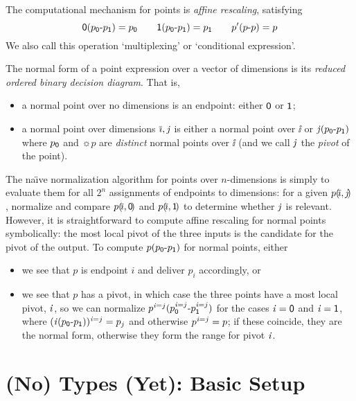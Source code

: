 \documentclass{article}
\begin{document}
The computational mechanism for points is \emph{affine rescaling}, satisfying
\[
\muxi\pze p = \sze p \qquad
\muxi\pun p = \sun p \qquad
\mux{p'}pp = p
\]
We also call this operation `multiplexing' or `conditional expression'.

The normal form of a point expression over a vector of dimensions
is its \emph{reduced ordered binary decision diagram}. That is,
\begin{itemize}
\item a normal point over no dimensions is an endpoint:
  either $\pze$ or $\pun$;
\item a normal point over dimensions $\ii, \vj$ is either a normal point
  over $\ii$ or $\muxi\vj p$ where $\sze p$ and $\sun p$ are \emph{distinct}
  normal points over $\ii$ (and we call $\vj$ the \emph{pivot} of the point).
\end{itemize}
The na\"\i{}ve normalization algorithm for points over $n$-dimensions is
simply to evaluate them for all $2^n$ assignments of endpoints to dimensions:
for a given $p\sv {\ii,\vj}$, normalize and compare $p\sv{\ii,\pze}$ and $p\sv{\ii,\pun}$ to determine whether $\vj$ is relevant. However, it is straightforward to compute
affine rescaling for normal points symbolically: the most local pivot
of the three inputs is the candidate for the pivot of the output.
To compute $\muxi pp$ for normal points, either
\begin{itemize}
\item we see that $p$ is endpoint $i$ and deliver $p_i$ accordingly, or
\item we see that $p$ has a pivot, in which case the three points have a most
  local pivot, $\vi$, so we can normalize $\muxi {p^{\vi=j}}{p^{\vi=j}}$ for the
  cases $\vi=\pze$ and $\vi=\pun$, where $(\muxi\vi p)^{\vi=j} = p_j$ and
  otherwise $p^{\vi=j} = p$; if these coincide, they are the normal form, otherwise
  they form the range for pivot $\vi$.
\end{itemize}


\section{(No) Types (Yet): Basic Setup}

\newcommand{\RULES}[2]{\[\begin{array}{c}#1 \medskip \\ #2 \end{array}\]}

\newcommand{\hb}{\!:\!}
\newcommand{\TY}{\blue\ast}
\newcommand{\N}{\underline}
\end{document}
